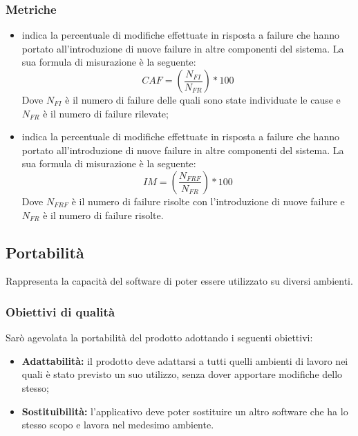\documentclass[PianoDiQualifica.tex]{subfiles}
\begin{document}
\subsubsection{Metriche}
\begin{itemize}
	\item {} indica la percentuale di modifiche effettuate in risposta a failure che hanno portato all'introduzione di nuove failure in altre componenti del sistema. La sua formula di misurazione è la seguente: \[CAF=(\frac{N_{FI}}{N_{FR}})*100\] Dove $ N_{FI} $ è il numero di failure delle quali sono state individuate le cause e $ N_{FR} $ è il numero di failure rilevate;
	\item {} indica la percentuale di modifiche effettuate in risposta a failure che hanno portato all'introduzione di nuove failure in altre componenti del sistema. La sua formula di misurazione è la seguente: \[IM=(\frac{N_{FRF}}{N_{FR}})*100\] Dove $ N_{FRF} $ è il numero di failure risolte con l'introduzione di nuove failure e $ N_{FR} $ è il numero di failure risolte.
\end{itemize}
\subsection{Portabilità}
Rappresenta la capacità del software di poter essere utilizzato su diversi ambienti.
\subsubsection{Obiettivi di qualità}
Sarò agevolata la portabilità del prodotto adottando i seguenti obiettivi:
\begin{itemize}
	\item \textbf{Adattabilità:} il prodotto deve adattarsi a tutti quelli ambienti di lavoro nei quali è stato previsto un suo utilizzo, senza dover apportare modifiche dello stesso;
	\item \textbf{Sostituibilità:} l'applicativo deve poter sostituire un altro software che ha lo stesso scopo e lavora nel medesimo ambiente.
\end{itemize}
\end{document}

